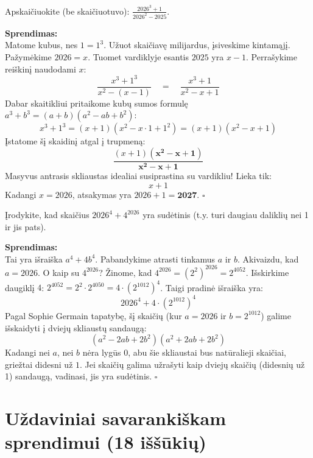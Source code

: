 \documentclass[11pt,a4paper]{scrartcl}
\begin{document}
\begin{example}
Apskaičiuokite (be skaičiuotuvo): $\frac{2026^3 + 1}{2026^2 - 2025}$.
\end{example}
\textbf{Sprendimas:}\\
Matome kubus, nes $1 = 1^3$. Užuot skaičiavę milijardus, įsiveskime kintamąjį. 
Pažymėkime $2026 = x$. Tuomet vardiklyje esantis $2025$ yra $x - 1$.
Perrašykime reiškinį naudodami $x$:
\[ \frac{x^3 + 1^3}{x^2 - (x - 1)} \quad = \quad \frac{x^3 + 1}{x^2 - x + 1} \]
Dabar skaitikliui pritaikome kubų sumos formulę $a^3 + b^3 = (a+b)(a^2 - ab + b^2)$:
\[ x^3 + 1^3 = (x + 1)(x^2 - x \cdot 1 + 1^2) = (x + 1)(x^2 - x + 1) \]
Įstatome šį skaidinį atgal į trupmeną:
\[ \frac{(x + 1)\mathbf{(x^2 - x + 1)}}{\mathbf{x^2 - x + 1}} \]
Masyvus antrasis skliaustas idealiai susiprastina su vardikliu! Lieka tik:
\[ x + 1 \]
Kadangi $x = 2026$, atsakymas yra $2026 + 1 = \mathbf{2027}$. \hfill $\square$


\begin{example}
Įrodykite, kad skaičius $2026^4 + 4^{2026}$ yra sudėtinis (t.y. turi daugiau daliklių nei 1 ir jis pats).
\end{example}

\textbf{Sprendimas:}\\
Tai yra išraiška $a^4 + 4b^4$. Pabandykime atrasti tinkamus $a$ ir $b$.
Akivaizdu, kad $a = 2026$. 
O kaip su $4^{2026}$? Žinome, kad $4^{2026} = (2^2)^{2026} = 2^{4052}$. 
Išskirkime daugiklį $4$: $2^{4052} = 2^2 \cdot 2^{4050} = 4 \cdot (2^{1012})^4$.
Taigi pradinė išraiška yra:
\[ 2026^4 + 4 \cdot (2^{1012})^4 \]
Pagal Sophie Germain tapatybę, šį skaičių (kur $a = 2026$ ir $b = 2^{1012}$) galime išskaidyti į dviejų skliaustų sandaugą:
\[ (a^2 - 2ab + 2b^2)(a^2 + 2ab + 2b^2) \]
Kadangi nei $a$, nei $b$ nėra lygūs $0$, abu šie skliaustai bus natūralieji skaičiai, griežtai didesni už $1$. Jei skaičių galima užrašyti kaip dviejų skaičių (didesnių už 1) sandaugą, vadinasi, jis yra sudėtinis. \hfill $\square$

\vspace{0.5cm}

\newpage
\section{Uždaviniai savarankiškam sprendimui (18 iššūkių)}
\end{document}
